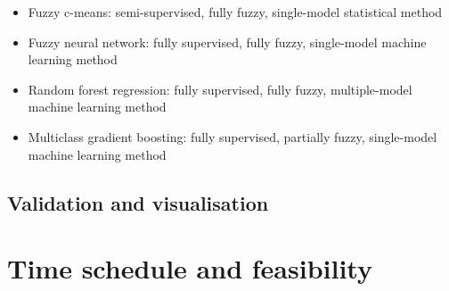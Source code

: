 \documentclass[a4paper,10pt]{article}
\begin{document}
\begin{itemize}
 \item Fuzzy c-means: semi-supervised, fully fuzzy, single-model statistical method
 \item Fuzzy neural network: fully supervised, fully fuzzy, single-model machine learning method
 \item Random forest regression: fully supervised, fully fuzzy, multiple-model machine learning method
 \item Multiclass gradient boosting: fully supervised, partially fuzzy, single-model machine learning method
\end{itemize}

\subsection{Validation and visualisation}

\section{Time schedule and feasibility}


\end{document}

